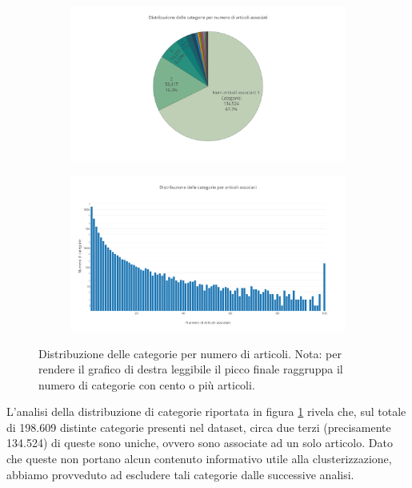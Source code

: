 \documentclass[
	11pt, %
	a4paper, %
	oneside, %
	headinclude,footinclude, %
	BCOR5mm, %
]{scrartcl}
\begin{document}
    \begin{figure}[!htb]
		\hspace{-4.5cm}
			\begin{subfigure}{.5\textwidth}
			\centering
			\includegraphics[scale=.5]{Figures/categoriesCake.png}
			\end{subfigure}
		\hspace{0.6cm}
			\begin{subfigure}{.5\textwidth}
			\centering
			\includegraphics[scale=.5]{Figures/categories.png}
			\end{subfigure}
		\caption{Distribuzione delle categorie per numero di articoli. Nota: per rendere il grafico di destra leggibile il picco finale raggruppa il numero di categorie con cento o più articoli.}
		\label{fig:categories}
	\end{figure}

	L'analisi della distribuzione di categorie riportata in figura \ref{fig:categories} rivela che, sul totale di 198.609 distinte categorie presenti nel dataset, circa due terzi (precisamente 134.524) di queste sono uniche, ovvero sono associate ad un solo articolo.
	Dato che queste non portano alcun contenuto informativo utile alla clusterizzazione, abbiamo provveduto ad escludere tali categorie dalle successive analisi.
\end{document}
